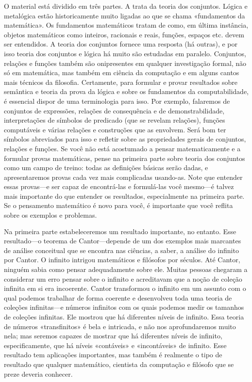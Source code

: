 O material está dividido em três partes. A  trata
da teoria dos conjuntos. Lógica e metalógica estão historicamente muito
ligadas ao que se chama «fundamentos da matemática». Os fundamentos
matemáticos tratam de como, em última instância, objetos matemáticos
como inteiros, racionais e reais, funções, espaços etc. devem ser
entendidos. A teoria dos conjuntos fornece uma resposta (há outras), e
por isso teoria dos conjuntos e lógica há muito são estudadas em
paralelo. Conjuntos, relações e funções também são onipresentes em
qualquer investigação formal, não só em matemática, mas também em
ciência da computação e em alguns cantos mais técnicos da filosofia.
Certamente, para formular e provar resultados sobre semântica e teoria
da prova da lógica e sobre os fundamentos da computabilidade, é
essencial dispor de uma terminologia para isso. Por exemplo, falaremos
de conjuntos de expressões, relações de consequência e de
demonstrabilidade, interpretações de símbolos de predicado (que se
revelam relações), funções computáveis e várias relações e construções
que as envolvem. Será bom ter símbolos abreviados para isso e refletir
sobre as propriedades gerais de conjuntos, relações e funções. Se você
não está acostumado a pensar matematicamente e a formular provas
matemáticas, pense na primeira parte sobre teoria dos conjuntos como
um campo de treino: todas as definições básicas serão dadas, e
apresentaremos provas cada vez mais complicadas usando-as. Note que
entender essas provas---e ser capaz de encontrá-las e formulá-las
você mesmo---é talvez mais importante do que entender os resultados,
especialmente na primeira parte. Se o pensamento matemático é novo para
você, é importante que você reflita sobre os exemplos e problemas.

Na primeira parte estabeleceremos um resultado importante, no entanto.
Esse resultado---o teorema de Cantor---depende de um dos exemplos mais
marcantes de análise conceitual que se encontra nas ciências, a saber,
a análise do infinito por Cantor. O infinito intrigou matemáticos e
filósofos por séculos. Até Cantor, ninguém sabia como pensar
adequadamente sobre ele. Muitas pessoas chegaram a considerar um erro
pensar sobre o infinito e acreditavam que a noção de coleção infinita
em si era incoerente. Cantor transformou o infinito em um assunto com
o qual podemos trabalhar de forma coerente e desenvolveu toda uma
teoria de coleções infinitas---e números infinitos com os quais
podemos medir os tamanhos de coleções infinitas. Ele mostrou que há
diferentes níveis de infinito. Essa teoria de números «transfinitos» é
bela e intricada, e não nos aprofundaremos muito nela; mas seremos
capazes de mostrar que há diferentes níveis de infinito,
especificamente, que há níveis «contáveis» e «incontáveis» de
infinito. Esse resultado tem aplicações importantes, mas também é
realmente o tipo de resultado que qualquer matemático, cientista da
computação e filósofo que se preze deveria conhecer.

